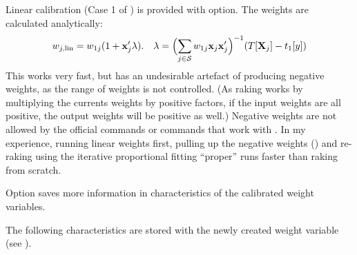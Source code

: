 Linear calibration (Case 1 of \citet{deville:sarndal:1992}) is provided with
 option. The weights are calculated analytically:
\begin{equation}
    \label{eq:linear:weight}
    w_{j,\rm{lin}} = w_{1j} (1+\mathbf{x}_j'\mathbf{\lambda}).
    \quad
    \mathbf{\lambda} = \Bigl( \sum_{j \in \mathcal{S}} w_{1j} \mathbf{x}_j \mathbf{x}_j' \Bigr)^{-1}
        ( T [ \mathbf{X}_j  ] - t_{1}[y] )
\end{equation}
This works very fast, but has an undesirable artefact of producing negative weights,
as the range of weights is not controlled. (As raking works by multiplying the currents
weights by positive factors, if the input weights are all positive, the output weights
will be positive as well.) Negative weights are not allowed by the official  commands
or commands that work with \stcmd{[pweights]}.
In my experience, running linear weights first,
pulling up the negative weights ()
and re-raking using the iterative proportional fitting ``proper'' runs faster than
raking from scratch.

Option  saves more information in characteristics of the calibrated
weight variables.

\cnp

\begin{stlog}
\nullskip
\end{stlog}

The following characteristics are stored with the newly created weight variable
(see ).

